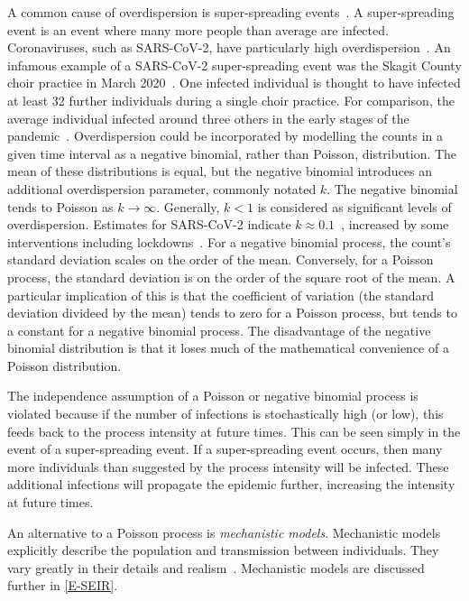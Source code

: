 \documentclass[thesis.tex]{subfiles}
\begin{document}
A common cause of overdispersion is super-spreading events~\autocite{lloyd-smithSuperspreading}.
A super-spreading event is an event where many more people than average are infected.
Coronaviruses, such as SARS-CoV-2, have particularly high overdispersion~\autocites{endoEstimating}{adamClustering}{mccloskeySARS}.
An infamous example of a SARS-CoV-2 super-spreading event was the Skagit County choir practice in March 2020~\autocite{hamnerHigh}.
One infected individual is thought to have infected at least 32 further individuals during a single choir practice.
For comparison, the average individual infected around three others in the early stages of the pandemic~\autocite{pellisChallenges}. 
Overdispersion could be incorporated by modelling the counts in a given time interval as a negative binomial, rather than Poisson, distribution.
The mean of these distributions is equal, but the negative binomial introduces an additional overdispersion parameter, commonly notated $k$.
The negative binomial tends to Poisson as $k\to\infty$.
Generally, $k<1$ is considered as significant levels of overdispersion.
Estimates for SARS-CoV-2 indicate $k \approx 0.1$~\autocite{endoEstimating}, increased by some interventions including lockdowns~\autocites{quiltyReconstructing}{quiltyUnderstanding}.
For a negative binomial process, the count's standard deviation scales on the order of the mean.
Conversely, for a Poisson process, the standard deviation is on the order of the square root of the mean.
A particular implication of this is that the coefficient of variation (the standard deviation divideed by the mean) tends to zero for a Poisson process, but tends to a constant for a negative binomial process.
The disadvantage of the negative binomial distribution is that it loses much of the mathematical convenience of a Poisson distribution.

The independence assumption of a Poisson or negative binomial process is violated because if the number of infections is stochastically high (or low), this feeds back to the process intensity at future times.
This can be seen simply in the event of a super-spreading event.
If a super-spreading event occurs, then many more individuals than suggested by the process intensity will be infected.
These additional infections will propagate the epidemic further, increasing the intensity at future times.

An alternative to a Poisson process is \emph{mechanistic models}.
Mechanistic models explicitly describe the population and transmission between individuals.
They vary greatly in their details and realism~\autocite{murilloMultiscale}.
Mechanistic models are discussed further in \cref{E-SEIR}.
\end{document}
